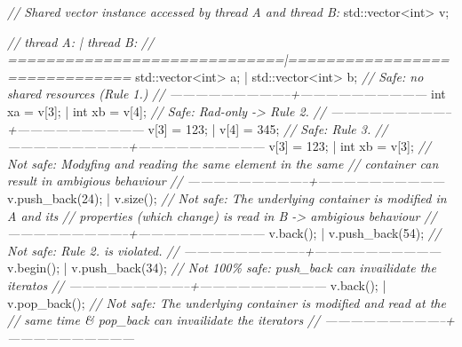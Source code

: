 \documentclass[]{article}
\newenvironment{Shaded}{}{}
\newcommand{\DataTypeTok}[1]{\textcolor[rgb]{0.56,0.13,0.00}{{#1}}}
\newcommand{\DecValTok}[1]{\textcolor[rgb]{0.25,0.63,0.44}{{#1}}}
\newcommand{\CommentTok}[1]{\textcolor[rgb]{0.38,0.63,0.69}{\textit{{#1}}}}
\newcommand{\NormalTok}[1]{{#1}}
\begin{document}
\begin{Shaded}
\begin{Highlighting}[]
\CommentTok{// Shared vector instance accessed by thread A and thread B:}
\NormalTok{std::vector<}\DataTypeTok{int}\NormalTok{> v;}

\CommentTok{// thread A:                    | thread B:}
\CommentTok{// =============================|==============================}
   \NormalTok{std::vector<}\DataTypeTok{int}\NormalTok{> a;          | std::vector<}\DataTypeTok{int}\NormalTok{> b;}
\CommentTok{// Safe: no shared resources (Rule 1.)}
\CommentTok{// -----------------------------+------------------------------}
   \DataTypeTok{int} \NormalTok{xa = v[}\DecValTok{3}\NormalTok{];               | }\DataTypeTok{int} \NormalTok{xb = v[}\DecValTok{4}\NormalTok{];}
\CommentTok{// Safe: Rad-only -> Rule 2.}
\CommentTok{// -----------------------------+------------------------------}
   \NormalTok{v[}\DecValTok{3}\NormalTok{] = }\DecValTok{123}\NormalTok{;                  | v[}\DecValTok{4}\NormalTok{] = }\DecValTok{345}\NormalTok{;}
\CommentTok{// Safe: Rule 3.}
\CommentTok{// -----------------------------+------------------------------}
   \NormalTok{v[}\DecValTok{3}\NormalTok{] = }\DecValTok{123}\NormalTok{;                  | }\DataTypeTok{int} \NormalTok{xb = v[}\DecValTok{3}\NormalTok{];}
\CommentTok{// Not safe: Modyfing and reading the same element in the same}
\CommentTok{// container can result in ambigious behaviour}
\CommentTok{// -----------------------------+------------------------------}
   \NormalTok{v.push_back(}\DecValTok{24}\NormalTok{);             | v.size();}
\CommentTok{// Not safe: The underlying container is modified in A and its}
\CommentTok{// properties (which change) is read in B -> ambigious behaviour}
\CommentTok{// -----------------------------+------------------------------}
   \NormalTok{v.back();                    | v.push_back(}\DecValTok{54}\NormalTok{);}
\CommentTok{// Not safe: Rule 2. is violated. }
\CommentTok{// -----------------------------+------------------------------}
   \NormalTok{v.begin();                   | v.push_back(}\DecValTok{34}\NormalTok{);}
\CommentTok{// Not 100\% safe: push_back can invailidate the iteratos}
\CommentTok{// -----------------------------+------------------------------}
   \NormalTok{v.back();                    | v.pop_back();}
\CommentTok{// Not safe: The underlying container is modified and read at the}
\CommentTok{// same time \& pop_back can invailidate the iterators}
\CommentTok{// -----------------------------+------------------------------}
\end{Highlighting}
\end{Shaded}
\end{document}
